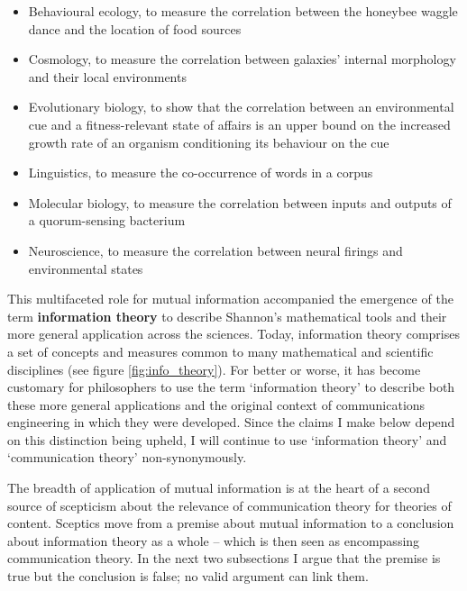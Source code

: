 \documentclass[12pt]{article}
\begin{document}
\begin{itemize}
    \item Behavioural ecology, to measure the correlation between the honeybee waggle dance and the location of food sources \citep{haldane1954statistical}
    \item Cosmology, to measure the correlation between galaxies' internal morphology and their local environments \citep{pandey2017how}
    \item Evolutionary biology, to show that the correlation between an environmental cue and a fitness-relevant state of affairs is an upper bound on the increased growth rate of an organism conditioning its behaviour on the cue \citep{donaldson-matasci2010fitness}
    \item Linguistics, to measure the co-occurrence of words in a corpus \citep[$\S$4]{hunston2002corpora}
    \item Molecular biology, to measure the correlation between inputs and outputs of a quorum-sensing bacterium \citep{mehta2009information}
    \item Neuroscience, to measure the correlation between neural firings and environmental states \citep[][and references therein]{rathkopf2017neural}
\end{itemize}

\noindent This multifaceted role for mutual information accompanied the emergence of the term \textbf{information theory} to describe Shannon's mathematical tools and their more general application across the sciences.
Today, information theory comprises a set of concepts and measures common to many mathematical and scientific disciplines (see figure \ref{fig:info_theory}).
For better or worse, it has become customary for philosophers to use the term `information theory' to describe both these more general applications and the original context of communications engineering in which they were developed.
Since the claims I make below depend on this distinction being upheld, I will continue to use `information theory' and `communication theory' non-synonymously.



The breadth of application of mutual information is at the heart of a second source of scepticism about the relevance of communication theory for theories of content.
Sceptics move from a premise about mutual information to a conclusion about information theory as a whole -- which is then seen as encompassing communication theory.
In the next two subsections I argue that the premise is true but the conclusion is false; no valid argument can link them.
\end{document}
